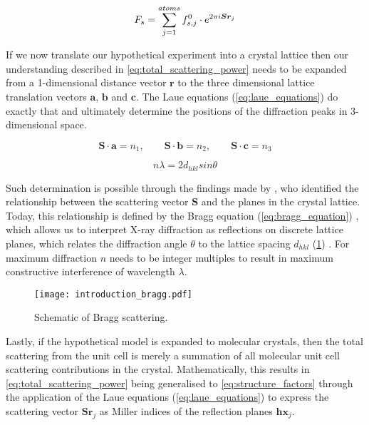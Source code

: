 \begin{equation}
    F_s=\sum_{j=1}^{atoms}f_{s,j}^0 \cdot e^{2\pi\\i\boldsymbol{S}\boldsymbol{r}_j}
    \label{eq:total_scattering_power}
\end{equation}

If we now translate our hypothetical experiment into a crystal lattice then our understanding described in \cref{eq:total_scattering_power} needs to be expanded from a 1-dimensional distance vector $\boldsymbol{r}$ to the three dimensional lattice translation vectors $\boldsymbol{a}$, $\boldsymbol{b}$ and $\boldsymbol{c}$. The Laue equations (\cref{eq:laue_equations}) do exactly that and ultimately determine the positions of the diffraction peaks in 3-dimensional space.

\begin{equation}
    \boldsymbol{S} \cdot \boldsymbol{a}=n_1, \quad \quad \boldsymbol{S} \cdot \boldsymbol{b}=n_2, \quad \quad \boldsymbol{S} \cdot \boldsymbol{c}=n_3
    \label{eq:laue_equations}
\end{equation}

\begin{equation}
    n\lambda=2d_{hkl}sin\theta
    \label{eq:bragg_equation}
\end{equation}

Such determination is possible through the findings made by \textcite{Bragg1913-cx}, who identified the relationship between the scattering vector $\boldsymbol{S}$ and the planes in the crystal lattice. Today, this relationship is defined by the Bragg equation (\cref{eq:bragg_equation}) \cite{Bragg1913-cx}, which allows us to interpret X-ray diffraction as reflections on discrete lattice planes, which relates the diffraction angle $\theta$ to the lattice spacing $d_{hkl}$ (\cref{fig:introduction_bragg}) \cite{Rupp2010-nc}. For maximum diffraction $n$ needs to be integer multiples to result in maximum constructive interference of wavelength $\lambda$.

\begin{figure}[H]
    \centering
    \texttt{[image: introduction\_bragg.pdf]}
    \caption{Schematic of Bragg scattering.}
    \label{fig:introduction_bragg}
\end{figure}

Lastly, if the hypothetical model is expanded to molecular crystals, then the total scattering from the unit cell is merely a summation of all molecular unit cell scattering contributions in the crystal. Mathematically, this results in \cref{eq:total_scattering_power} being generalised to \cref{eq:structure_factors} through the application of the Laue equations (\cref{eq:laue_equations}) to express the scattering vector $\boldsymbol{S}\boldsymbol{r}_j$ as Miller indices of the reflection planes $\boldsymbol{h}\boldsymbol{x}_j$.

